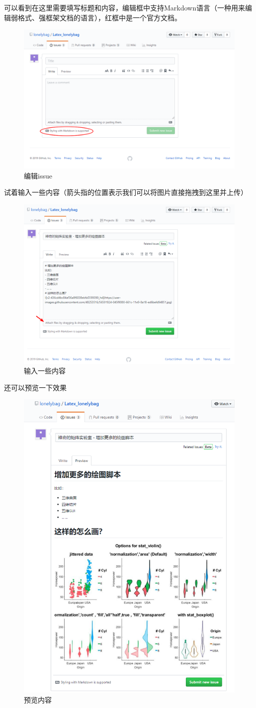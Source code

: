 \documentclass[UTF8,oneside]{ctexbook}
\begin{document}
可以看到在这里需要填写标题和内容，编辑框中支持Markdown语言（一种用来编辑弱格式、强框架文档的语言），红框中是一个官方文档。
\begin{figure}[H]
	\centering
	\includegraphics[width=0.6\linewidth]{Pics/issue3.png}
	\vspace{-0.3cm}
	\caption{编辑issue}\label{fig:issue3}
\end{figure}

试着输入一些内容（箭头指的位置表示我们可以将图片直接拖拽到这里并上传）
\begin{figure}[H]
	\centering
	\includegraphics[width=0.6\linewidth]{Pics/issue4.png}
	\vspace{-0.3cm}
	\caption{输入一些内容}\label{fig:issue4}
\end{figure}

还可以预览一下效果
\begin{figure}[H]
	\centering
	\includegraphics[width=0.6\linewidth]{Pics/issue5.png}
	\vspace{-0.3cm}
	\caption{预览内容}\label{fig:issue5}
\end{figure}
\end{document}
